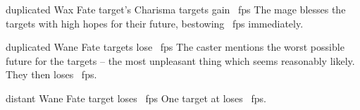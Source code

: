   {duplicated}%
  {Wax}%
  {Fate}%
  {target's Charisma}%
  { targets gain \showDam~\glspl{fp}}%
  {
    The mage blesses the targets with high hopes for their future, bestowing \showDam~\glspl{fp} immediately.
  }

  {duplicated}%
  {Wane}%
  {Fate}%
  {}%
  { targets lose \showDam~\glspl{fp}}%
  {
    The caster mentions the worst possible future for the targets -- the most unpleasant thing which seems reasonably likely.
    They then loses \showDam~\glspl{fp}.
  }

  {distant}%
  {Wane}%
  {Fate}%
  {}%
  {target loses \showDam~\glspl{fp}}%
  {
    One target at \spellRange{} loses \showDam~\glspl{fp}.
  }

